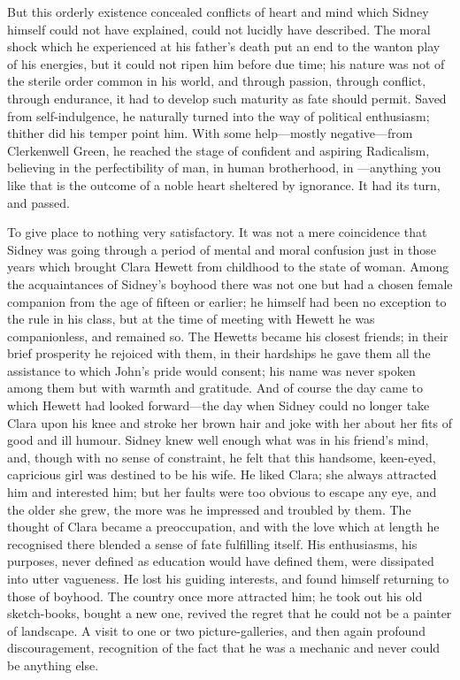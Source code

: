 But this orderly existence concealed conflicts of heart and mind which
Sidney himself could not have explained, could not lucidly have
described. The moral shock which he experienced at his father's death
put an end to the wanton play of his energies, but it could not ripen
him before due time; his nature was not of the sterile order common in
his world, and through passion, through conflict, through endurance, it
had to develop such maturity as fate should permit. Saved from
self-indulgence, he naturally turned into the way of political
enthusiasm; thither did his temper point him. With some help---mostly
negative---from Clerkenwell Green, he reached the stage of confident and
aspiring Radicalism, believing in the perfectibility of man, in human
brotherhood, in {}---anything you like that is the outcome of a noble
heart sheltered by ignorance. It had its turn, and passed.

To give place to nothing very satisfactory. It was not a mere
coincidence that Sidney was going through a period of mental and moral
confusion just in those years which brought Clara Hewett from childhood
to the state of woman. Among the acquaintances of Sidney's boyhood there
was not one but had a chosen female companion from the age of fifteen or
earlier; he himself had been no exception to the rule in his class, but
at the time of meeting with Hewett he was companionless, and remained
so. The Hewetts became his closest friends; in their brief prosperity he
rejoiced with them, in their hardships he gave them all the assistance
to which John's pride would consent; his name was never spoken among
them but with warmth and gratitude. And of course the day came to which
Hewett had looked forward---the day when Sidney could no longer take
Clara upon his knee and stroke her {}brown hair and joke with her about
her fits of good and ill humour. Sidney knew well enough what was in his
friend's mind, and, though with no sense of constraint, he felt that
this handsome, keen-eyed, capricious girl was destined to be his wife.
He liked Clara; she always attracted him and interested him; but her
faults were too obvious to escape any eye, and the older she grew, the
more was he impressed and troubled by them. The thought of Clara became
a preoccupation, and with the love which at length he recognised there
blended a sense of fate fulfilling itself. His enthusiasms, his
purposes, never defined as education would have defined them, were
dissipated into utter vagueness. He lost his guiding interests, and
found himself returning to those of boyhood. The country once more
attracted him; he took out his old sketch-books, bought a new one,
revived the regret that he could not be a painter of landscape. A visit
to one or two picture-galleries, and then again profound discouragement,
recognition of the fact that {}he was a mechanic and never could be
anything else.

